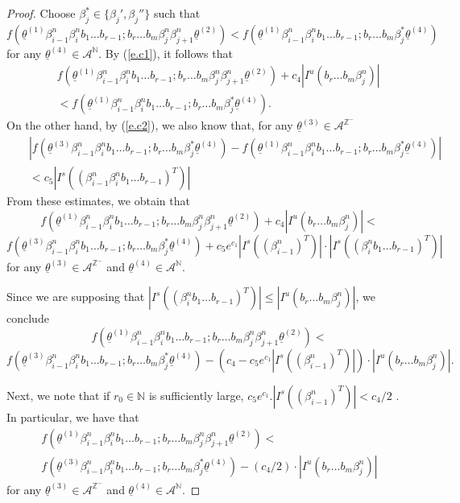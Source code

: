 \documentclass[12pt]{amsart}
\theoremstyle{plain} %
\theoremstyle{definition} %
\numberwithin{equation}{section}
\begin{document}
\begin{proof}
Choose $\beta_j^{\ast}\in\{\beta_j', \beta_j''\}$ such that 
$$f(\underline{\theta}^{(1)}\beta^n_{i-1}\beta^n_i b_1\dots b_{r-1}; b_r\dots b_{m}\beta^n_j\beta^n_{j+1}\underline{\theta}^{(2)})<f(\underline{\theta}^{(1)}\beta^n_{i-1}\beta^n_i b_1\dots b_{r-1}; b_r\dots b_{m}\beta_j^{\ast}\underline{\theta}^{(4)})$$
for any $\underline{\theta}^{(4)}\in\mathcal{A}^{\mathbb{N}}$. By (\ref{e.c1}), it follows that  
\begin{eqnarray*}
& &f(\underline{\theta}^{(1)}\beta^n_{i-1}\beta^n_i b_1\dots b_{r-1}; b_r\dots b_{m}\beta^n_j\beta^n_{j+1}\underline{\theta}^{(2)}) + c_4|I^u(b_r\dots b_{m}\beta^n_j)| \\ & &< f(\underline{\theta}^{(1)}\beta^n_{i-1}\beta^n_i b_1\dots b_{r-1}; b_r\dots b_{m}\beta_j^{\ast}\underline{\theta}^{(4)}).
\end{eqnarray*}
On the other hand, by (\ref{e.c2}), we also know that, for any $\underline{\theta}^{(3)}\in\mathcal{A}^{\mathbb{Z}^-}$
\begin{eqnarray*}
& & |f(\underline{\theta}^{(3)}\beta^n_{i-1}\beta^n_i b_1\dots b_{r-1}; b_r\dots b_{m}\beta_j^{\ast}\underline{\theta}^{(4)}) - f(\underline{\theta}^{(1)}\beta^n_{i-1}\beta^n_i b_1\dots b_{r-1}; b_r\dots b_{m}\beta_j^{\ast}\underline{\theta}^{(4)})| \\ & & < c_5 |I^s((\beta^n_{i-1}\beta^n_i b_1\dots b_{r-1})^T)|
\end{eqnarray*}
From these estimates, we obtain that 
$$f(\underline{\theta}^{(1)}\beta^n_{i-1}\beta^n_i b_1\dots b_{r-1}; b_r\dots b_{m}\beta^n_j\beta^n_{j+1}\underline{\theta}^{(2)}) + c_4|I^u(b_r\dots b_{m}\beta^n_j)|<$$
$$f(\underline{\theta}^{(3)}\beta^n_{i-1}\beta^n_i b_1\dots b_{r-1}; b_r\dots b_{m}\beta_j^{\ast}\underline{\theta}^{(4)}) + c_5 e^{c_1}|I^s((\beta^n_{i-1})^T)|\cdot |I^s((\beta^n_i b_1\dots b_{r-1})^T)|$$
for any $\underline{\theta}^{(3)}\in\mathcal{A}^{\mathbb{Z}^-}$ and $\underline{\theta}^{(4)}\in\mathcal{A}^{\mathbb{N}}$. 

Since we are supposing that $|I^s((\beta^n_i b_1\dots b_{r-1})^T)|\leq |I^u(b_r\dots b_{m}\beta^n_j)|$, we conclude
$$f(\underline{\theta}^{(1)}\beta^n_{i-1}\beta^n_i b_1\dots b_{r-1}; b_r\dots b_{m}\beta^n_j\beta^n_{j+1}\underline{\theta}^{(2)})<$$
$$f(\underline{\theta}^{(3)}\beta^n_{i-1}\beta^n_i b_1\dots b_{r-1}; b_r\dots b_{m}\beta_j^{\ast}\underline{\theta}^{(4)}) - (c_4- c_5 e^{c_1} |I^s((\beta^n_{i-1})^T)|)\cdot |I^u(b_r\dots b_{m}\beta^n_j)|.$$

Next, we note that if $r_0\in\mathbb{N}$ is sufficiently large, $c_5 e^{c_1}.|I^s((\beta^n_{i-1})^T)|<c_4/2$ . In particular, we have that 
\begin{eqnarray}\label{e.decreasing-f-caseIa}f(\underline{\theta}^{(1)}\beta^n_{i-1}\beta^n_i b_1\dots b_{r-1}; b_r\dots b_{m}\beta^n_j\beta^n_{j+1}\underline{\theta}^{(2)})< \\
f(\underline{\theta}^{(3)}\beta^n_{i-1}\beta^n_i b_1\dots b_{r-1}; b_r\dots b_{m}\beta_j^{\ast}\underline{\theta}^{(4)}) - (c_4/2)\cdot |I^u(b_r\dots b_{m}\beta^n_j)|\nonumber
\end{eqnarray}
for any $\underline{\theta}^{(3)}\in\mathcal{A}^{\mathbb{Z}^-}$ and $\underline{\theta}^{(4)}\in\mathcal{A}^{\mathbb{N}}$. 


\end{proof}
\end{document}
